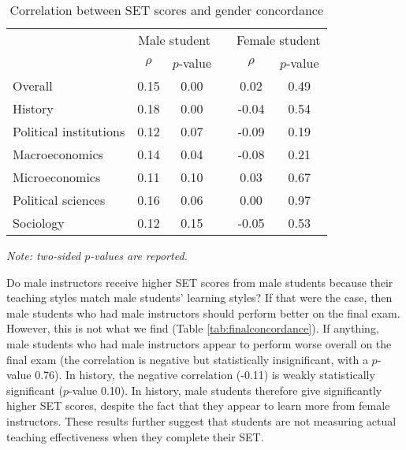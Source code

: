 \documentclass[12pt]{article}
\begin{document}
\begin{table}[htbp]
  \centering
  \footnotesize 
  \caption{Correlation between SET scores and gender concordance}
    \begin{tabular}{lccccc}
    \toprule 
          & \multicolumn{2}{c}{Male student}  &  & \multicolumn{2}{c}{Female student} \\
      & $\rho$  &  $p$-value &  & $\rho$  &  $p$-value    \\
   \midrule
      \quad  Overall &                 0.15       & 0.00 & &  0.02       & 0.49      \\
      \quad  History &                 0.18       & 0.00 & & -0.04       & 0.54      \\
      \quad  Political institutions &  0.12       & 0.07 & & -0.09       & 0.19       \\
      \quad  Macroeconomics &          0.14       & 0.04 & & -0.08       & 0.21     \\
      \quad  Microeconomics &          0.11       & 0.10 & &  0.03       & 0.67       \\
      \quad  Political sciences &      0.16       & 0.06 & &  0.00       & 0.97      \\
      \quad  Sociology &               0.12       & 0.15 & & -0.05       & 0.53      \\
    \bottomrule
    \end{tabular}%
 \label{tab:genderconcordance}%
  
  \textit{Note: two-sided $p$-values are reported.}
\end{table}%
\normalsize




Do male instructors receive higher SET scores from male students because their teaching styles match male students' learning styles? If that were the case, then male students who had male instructors should perform better on the final exam. However, this is not what we find (Table \ref{tab:finalconcordance}). If anything, male students who had male instructors appear to perform worse overall on the final exam (the correlation is negative but statistically insignificant, with a $p$-value 0.76). In history, the negative correlation (-0.11) is weakly statistically significant ($p$-value 0.10). In history, male students therefore give significantly higher SET scores, despite the fact that they appear to learn more from female instructors. These results further suggest that students are not measuring actual teaching effectiveness when they complete their SET. 
\end{document}

